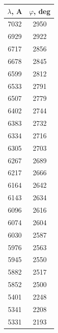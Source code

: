 \documentclass[a4paper, 12pt]{article}
\begin{document}
\begin{table}[H]
	\centering
	\begin{tabular}{|c|c|}
	\hline
	\textbf{$\lambda$,   A} & \textbf{$\varphi$, deg} \\ \hline
	7032                 & 2950              \\ \hline
	6929                 & 2922              \\ \hline
	6717                 & 2856              \\ \hline
	6678                 & 2845              \\ \hline
	6599                 & 2812              \\ \hline
	6533                 & 2791              \\ \hline
	6507                 & 2779              \\ \hline
	6402                 & 2744              \\ \hline
	6383                 & 2732              \\ \hline
	6334                 & 2716              \\ \hline
	6305                 & 2703              \\ \hline
	6267                 & 2689              \\ \hline
	6217                 & 2666              \\ \hline
	6164                 & 2642              \\ \hline
	6143                 & 2634              \\ \hline
	6096                 & 2616              \\ \hline
	6074                 & 2604              \\ \hline
	6030                 & 2587              \\ \hline
	5976                 & 2563              \\ \hline
	5945                 & 2550              \\ \hline
	5882                 & 2517              \\ \hline
	5852                 & 2500              \\ \hline
	5401                 & 2248              \\ \hline
	5341                 & 2208              \\ \hline
	5331                 & 2193              \\ \hline
	\end{tabular}
\end{table}
\end{document}
